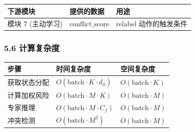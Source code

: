 \documentclass[
  12pt,
]{ctexart}
\begin{document}
\begin{longtable}[]{@{}
  >{\raggedright\arraybackslash}p{}
  >{\raggedright\arraybackslash}p{}
  >{\raggedright\arraybackslash}p{}@{}}
\toprule\noalign{}
\begin{minipage}[b]{\linewidth}\raggedright
下游模块
\end{minipage} & \begin{minipage}[b]{\linewidth}\raggedright
提供的数据
\end{minipage} & \begin{minipage}[b]{\linewidth}\raggedright
用途
\end{minipage} \\
\midrule\noalign{}
\endhead
\bottomrule\noalign{}
\endlastfoot
模块 7 (主动学习) & \(\text{conflict\_score}\) & relabel
动作的触发条件 \\
\end{longtable}

\subsubsection{5.6 计算复杂度}\label{ux8ba1ux7b97ux590dux6742ux5ea6-4}

\begin{longtable}[]{@{}
  >{\raggedright\arraybackslash}p{}
  >{\raggedright\arraybackslash}p{}
  >{\raggedright\arraybackslash}p{}@{}}
\toprule\noalign{}
\begin{minipage}[b]{\linewidth}\raggedright
步骤
\end{minipage} & \begin{minipage}[b]{\linewidth}\raggedright
时间复杂度
\end{minipage} & \begin{minipage}[b]{\linewidth}\raggedright
空间复杂度
\end{minipage} \\
\midrule\noalign{}
\endhead
\bottomrule\noalign{}
\endlastfoot
获取状态分配 & \(O(\text{batch} \cdot K \cdot d_\phi)\) &
\(O(\text{batch} \cdot K)\) \\
计算加权风险 & \(O(\text{batch} \cdot M \cdot K)\) &
\(O(\text{batch} \cdot M)\) \\
专家推理 & \(O(\text{batch} \cdot M \cdot C_f)\) &
\(O(\text{batch} \cdot M)\) \\
冲突检测 & \(O(\text{batch} \cdot M^2)\) &
\(O(\text{batch} \cdot M)\) \\
\end{longtable}
\end{document}
